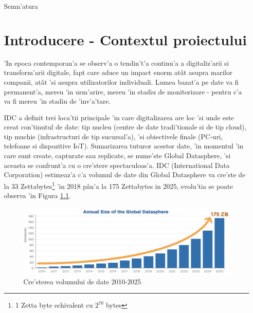 \documentclass[12pt,a4paper,twoside]{report}
\begin{document}
\vspace{1cm}
\hspace{9.4cm}Semn'atura

\thispagestyle{empty}

\newpage




 

\newpage
\tableofcontents


\newpage
{}

\setcounter{page}{1}


\chapter{Introducere - Contextul proiectului}
\pagestyle{headings}
'In epoca contemporan'a se observ'a o tendin't'a continu'a a digitaliz'arii si transform'arii digitale, fapt care aduce un impact enorm atât asupra marilor companii, atât 'si asupra utilizatorilor individuali. Lumea bazat'a pe date va fi permanent'a, mereu 'in urm'arire, mereu 'in stadiu de monitorizare - pentru c'a va fi mereu 'in stadiu de 'inv'a'tare.

IDC\cite{IDCdigitization}  a definit trei loca'tii principale 'in care digitalizarea are loc 'si unde este creat con'tinutul de date: tip nucleu (centre de date tradi'tionale si de tip cloud), tip muchie (infrastructuri de tip sucursal'a), 'si obiectivele finale (PC-uri, telefoane si dispozitive IoT). Sumarizarea tuturor acestor date, 'in momentul 'in care sunt  create, capturate sau replicate, se nume'ste Global Datasphere, 'si aceasta se confrunt'a cu o cre'stere spectaculoas'a. IDC (International Data Corporation) estimeaz'a c'a volumul de date din Global Datasphere va cre'ste de la 33 Zettabytes\footnote{1 Zetta byte echivalent cu $2^{70}$ bytes} 'in 2018 pân'a la 175 Zettabytes in 2025, evolu'tia se poate observa 'in Figura \ref{data_grow}.

\begin{figure}[H]
\begin{center}
\advance\leftskip-3cm
\advance\rightskip-3cm
\includegraphics[keepaspectratio=true,scale=0.55]{img/data_grow.png}
\caption{Cre'sterea volumului de date 2010-2025}
\label{data_grow}
\end{center}
\end{figure}
\end{document}
